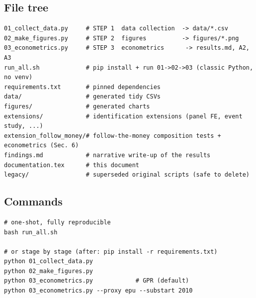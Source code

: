 \documentclass[11pt,a4paper]{article}
\begin{document}
\subsection{File tree}
\begin{lstlisting}
01_collect_data.py     # STEP 1  data collection  -> data/*.csv
02_make_figures.py     # STEP 2  figures          -> figures/*.png
03_econometrics.py     # STEP 3  econometrics      -> results.md, A2, A3
run_all.sh             # pip install + run 01->02->03 (classic Python, no venv)
requirements.txt       # pinned dependencies
data/                  # generated tidy CSVs
figures/               # generated charts
extensions/            # identification extensions (panel FE, event study, ...)
extension_follow_money/# follow-the-money composition tests + econometrics (Sec. 6)
findings.md            # narrative write-up of the results
documentation.tex      # this document
legacy/                # superseded original scripts (safe to delete)
\end{lstlisting}

\subsection{Commands}
\begin{lstlisting}
# one-shot, fully reproducible
bash run_all.sh

# or stage by stage (after: pip install -r requirements.txt)
python 01_collect_data.py
python 02_make_figures.py
python 03_econometrics.py            # GPR (default)
python 03_econometrics.py --proxy epu --substart 2010
\end{lstlisting}
\end{document}
